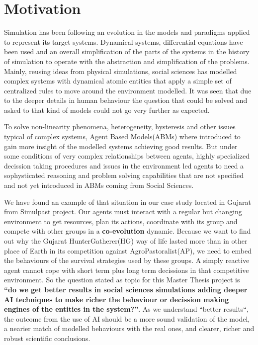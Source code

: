 \documentclass[11pt,oneside,a4paper,openright]{report}
\begin{document}

\section{Motivation}

Simulation has been following an evolution in the models and paradigms applied to represent its target
systems. Dynamical systems, differential equations have been used and an overall simplification of the parts of the systems in the history of simulation to operate with the abstraction and simplification of the problems.
Mainly, reusing ideas from physical simulations, social sciences has modelled complex systems with dynamical
atomic entities that apply a simple set of centralized rules to move around the environment modelled. It was seen that due to the deeper details in human behaviour the question that could be solved and asked to that kind of models could not go very further as expected.

To solve non-linearity phenomena, heterogeneity, hysteresis\cite[p.571–597]{hysteresisDef} and other issues typical of complex systems, Agent Based Models(ABMs) where introduced to gain more insight of the modelled systems achieving good results. But under 
some conditions of very complex relationships between agents, highly specialized decission taking procedures
and issues in the environment led agents to need a sophysticated reasoning and problem solving capabilities
that are not specified and not yet introduced in ABMs coming from Social Sciences.

We have found an example of that situation in our case study located in Gujarat from Simulpast project. Our agents must interact with a regular but changing environment to get resources, plan its actions, coordinate with its group and compete with other groups in a \textbf{co-evolution} dynamic. Because we want to find out why the Gujarat HunterGatherer(HG) way of life lasted more than in other place of Earth in its competition against AgroPastoralist(AP), we need to embed the behaviours of the survival strategies used by these groups. A simply reactive agent cannot cope with short term plus long term decissions in that competitive environment. So the question stated as topic for this Master Thesis project is \textbf{``do we get better results in social sciences simulations adding deeper AI techniques to make richer the behaviour or decission making engines of the entities in the system?''}. As we understand ``better results``, the outcome from the use of AI should be a more sound validation of the model, a nearier match of modelled behaviours with the real ones, and clearer, richer and robust scientific conclusions.
\end{document}
